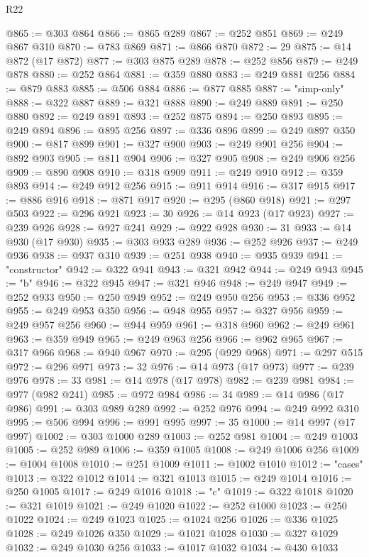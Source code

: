 \begin{lexlean}{R22}
\begin{coremodule}
@865 := @303 @864
@866 := @865 @289
@867 := @252 @851
@869 := @249 @867 @310
@870 := @783 @869
@871 := @866 @870
@872 := 29
@875 := @14 @872 (@17 @872)
@877 := @303 @875 @289
@878 := @252 @856
@879 := @249 @878
@880 := @252 @864
@881 := @359 @880
@883 := @249 @881 @256
@884 := @879 @883
@885 := @506 @884
@886 := @877 @885
@887 := "simp-only"
@888 := @322 @887
@889 := @321 @888
@890 := @249 @889
@891 := @250 @880
@892 := @249 @891
@893 := @252 @875
@894 := @250 @893
@895 := @249 @894
@896 := @895 @256
@897 := @336 @896
@899 := @249 @897 @350
@900 := @817 @899
@901 := @327 @900
@903 := @249 @901 @256
@904 := @892 @903
@905 := @811 @904
@906 := @327 @905
@908 := @249 @906 @256
@909 := @890 @908
@910 := @318 @909
@911 := @249 @910
@912 := @359 @893
@914 := @249 @912 @256
@915 := @911 @914
@916 := @317 @915
@917 := @886 @916
@918 := @871 @917
@920 := @295 (@860 @918)
@921 := @297 @503
@922 := @296 @921
@923 := 30
@926 := @14 @923 (@17 @923)
@927 := @239 @926
@928 := @927 @241
@929 := @922 @928
@930 := 31
@933 := @14 @930 (@17 @930)
@935 := @303 @933 @289
@936 := @252 @926
@937 := @249 @936
@938 := @937 @310
@939 := @251 @938
@940 := @935 @939
@941 := "constructor"
@942 := @322 @941
@943 := @321 @942
@944 := @249 @943
@945 := "b"
@946 := @322 @945
@947 := @321 @946
@948 := @249 @947
@949 := @252 @933
@950 := @250 @949
@952 := @249 @950 @256
@953 := @336 @952
@955 := @249 @953 @350
@956 := @948 @955
@957 := @327 @956
@959 := @249 @957 @256
@960 := @944 @959
@961 := @318 @960
@962 := @249 @961
@963 := @359 @949
@965 := @249 @963 @256
@966 := @962 @965
@967 := @317 @966
@968 := @940 @967
@970 := @295 (@929 @968)
@971 := @297 @515
@972 := @296 @971
@973 := 32
@976 := @14 @973 (@17 @973)
@977 := @239 @976
@978 := 33
@981 := @14 @978 (@17 @978)
@982 := @239 @981
@984 := @977 (@982 @241)
@985 := @972 @984
@986 := 34
@989 := @14 @986 (@17 @986)
@991 := @303 @989 @289
@992 := @252 @976
@994 := @249 @992 @310
@995 := @506 @994
@996 := @991 @995
@997 := 35
@1000 := @14 @997 (@17 @997)
@1002 := @303 @1000 @289
@1003 := @252 @981
@1004 := @249 @1003
@1005 := @252 @989
@1006 := @359 @1005
@1008 := @249 @1006 @256
@1009 := @1004 @1008
@1010 := @251 @1009
@1011 := @1002 @1010
@1012 := "cases"
@1013 := @322 @1012
@1014 := @321 @1013
@1015 := @249 @1014
@1016 := @250 @1005
@1017 := @249 @1016
@1018 := "c"
@1019 := @322 @1018
@1020 := @321 @1019
@1021 := @249 @1020
@1022 := @252 @1000
@1023 := @250 @1022
@1024 := @249 @1023
@1025 := @1024 @256
@1026 := @336 @1025
@1028 := @249 @1026 @350
@1029 := @1021 @1028
@1030 := @327 @1029
@1032 := @249 @1030 @256
@1033 := @1017 @1032
@1034 := @430 @1033

\end{coremodule}
\end{lexlean}
